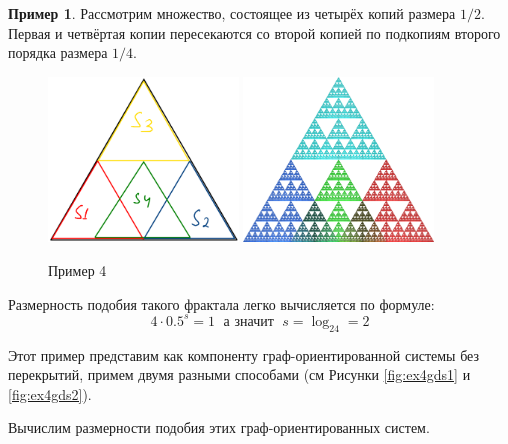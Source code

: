 \documentclass[a4paper,14pt]{extarticle} %
\newcommand{\0}{\varnothing}
\newcommand{\8}{\infty}
\theoremstyle{definition}
\newtheorem{example}{Пример}
\begin{document}
\begin{example}\label{ex:4}
Рассмотрим множество, состоящее из четырёх копий размера $1/2$.
Первая и четвёртая копии пересекаются со второй копией по подкопиям второго порядка размера $1/4$.
\begin{figure}[H]
    \centering
    \includegraphics[width=0.45\textwidth]{e4k1.png}
    \hfill
    \includegraphics[width=0.45\textwidth]{e4k.png}
    \begin{minipage}{0.85\textwidth}
        \caption{Пример 4}
        \label{fig:ex4}   
    \end{minipage}
\end{figure}

Размерность подобия такого фрактала легко вычисляется по формуле:
$$4\cdot0.5^s=1\;\text{ а значит }\;s=\log_24=2$$

Этот пример представим как компоненту граф-ориентированной системы без перекрытий, примем двумя разными способами (см Рисунки \ref{fig:ex4gds1} и \ref{fig:ex4gds2}).

Вычислим размерности подобия этих граф-ориентированных систем.


\end{example}
\end{document}

